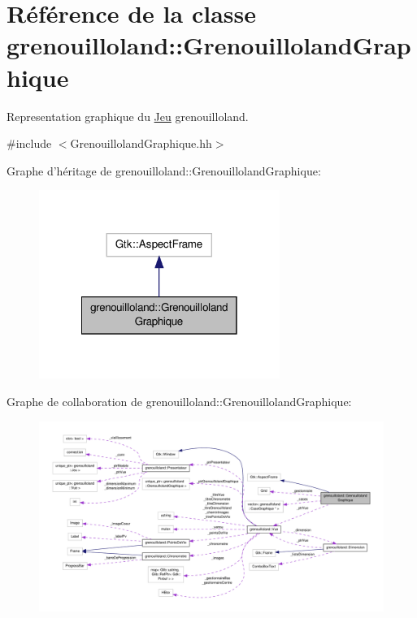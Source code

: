 \hypertarget{classgrenouilloland_1_1GrenouillolandGraphique}{\section{Référence de la classe grenouilloland\-:\-:Grenouilloland\-Graphique}
\label{classgrenouilloland_1_1GrenouillolandGraphique}
}


Representation graphique du \hyperlink{classgrenouilloland_1_1Jeu}{Jeu} grenouilloland.  




{\ttfamily \#include $<$Grenouilloland\-Graphique.\-hh$>$}



Graphe d'héritage de grenouilloland\-:\-:Grenouilloland\-Graphique\-:
\nopagebreak
\begin{figure}[H]
\begin{center}
\leavevmode
\includegraphics[width=222pt]{classgrenouilloland_1_1GrenouillolandGraphique__inherit__graph}
\end{center}
\end{figure}


Graphe de collaboration de grenouilloland\-:\-:Grenouilloland\-Graphique\-:
\nopagebreak
\begin{figure}[H]
\begin{center}
\leavevmode
\includegraphics[width=350pt]{classgrenouilloland_1_1GrenouillolandGraphique__coll__graph}
\end{center}
\end{figure}
